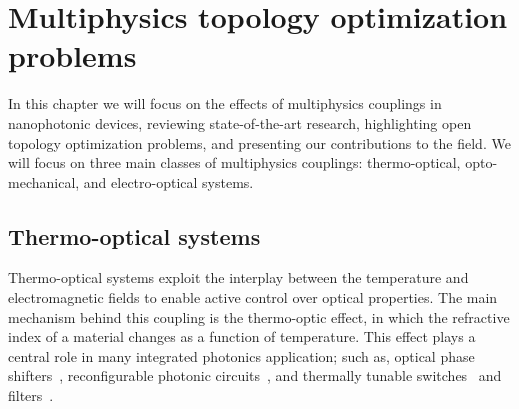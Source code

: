\chapter{Multiphysics topology optimization problems}

In this chapter we will focus on the effects of multiphysics couplings in nanophotonic devices, reviewing state-of-the-art research, 
highlighting open topology optimization problems, and presenting our contributions to the field.
We will focus on three main classes of multiphysics couplings: thermo-optical, opto-mechanical, and electro-optical systems.








\section{Thermo-optical systems~\cite{ownpub0,ownpub4}}

Thermo-optical systems exploit the interplay between the temperature and electromagnetic fields to enable active control over optical properties. 
The main mechanism behind this coupling is the thermo-optic effect, 
in which the refractive index of a material changes as a function of temperature. 
This effect plays a central role in many integrated photonics application; such as,
 optical phase shifters~\cite{TOPS_1, TOPS_2, TOPS_3}, reconfigurable photonic circuits~\cite{program, PIC}, and thermally tunable switches~\cite{switch, switch_2} and filters~\cite{filter}.


